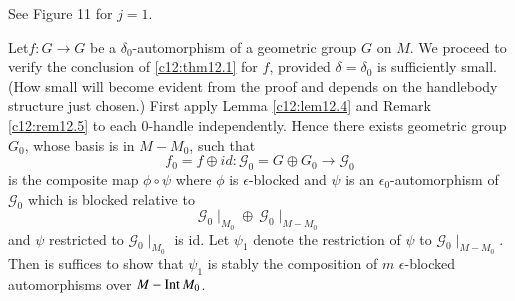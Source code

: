 See Figure 11 for $j=1$. 
\begin{figure}[H]
\end{figure}

Let\pageoriginale $f:G \to G$ be a $\delta_0$-automorphism of a
geometric group $G$ on $M$. We proceed to verify the conclusion of
\ref{c12:thm12.1} for $f$, provided $\delta= \delta_0$ is sufficiently
small. (How small will become evident from the proof and depends on
the handlebody structure just chosen.) First apply Lemma
\ref{c12:lem12.4} and Remark \ref{c12:rem12.5} to each 0-handle
independently. Hence there exists geometric group $G_0$, whose basis
is in $M- M_0$, such that 
$$
f_0 = f \oplus id: \mathcal{G}_0 = G \oplus G_0 \to \mathcal{G}_0
$$
is the composite map $\phi \circ \psi$ where $\phi$ is
$\epsilon$-blocked and $\psi$ is an $\epsilon_0$-automor\-phism of
$\mathcal{G}_0$ which is blocked relative to 
$$
\mathcal{G}_0 \mid_{M_0} \oplus ~\mathcal{G}_0 \mid_{M- M_0}
$$
and $\psi$ restricted to $\mathcal{G}_0 \mid_{M_0}$ is id. Let
$\psi_1$ denote the restriction of $\psi$ to $\mathcal{G}_0 \mid_{M-
  M_0}$. Then is suffices to show that $\psi_1$ is stably the
composition of $m$ $\epsilon$-blocked automorphisms over $M- \operatorname{Int} M_0$.

